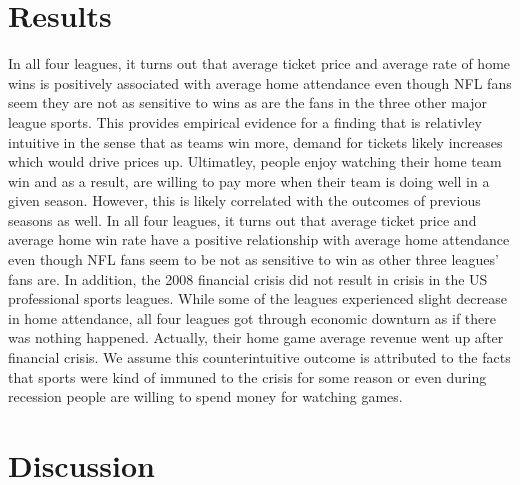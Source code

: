 \documentclass[man, fleqn, noextraspace,floatsintext]{apa6}
\begin{document}
\section{Results}\label{results}

In all four leagues, it turns out that average ticket price and average
rate of home wins is positively associated with average home attendance
even though NFL fans seem they are not as sensitive to wins as are the
fans in the three other major league sports. This provides empirical
evidence for a finding that is relativley intuitive in the sense that as
teams win more, demand for tickets likely increases which would drive
prices up. Ultimatley, people enjoy watching their home team win and as
a result, are willing to pay more when their team is doing well in a
given season. However, this is likely correlated with the outcomes of
previous seasons as well. In all four leagues, it turns out that average
ticket price and average home win rate have a positive relationship with
average home attendance even though NFL fans seem to be not as sensitive
to win as other three leagues' fans are. In addition, the 2008 financial
crisis did not result in crisis in the US professional sports leagues.
While some of the leagues experienced slight decrease in home
attendance, all four leagues got through economic downturn as if there
was nothing happened. Actually, their home game average revenue went up
after financial crisis. We assume this counterintuitive outcome is
attributed to the facts that sports were kind of immuned to the crisis
for some reason or even during recession people are willing to spend
money for watching games.

\section{Discussion}\label{discussion}
\end{document}
